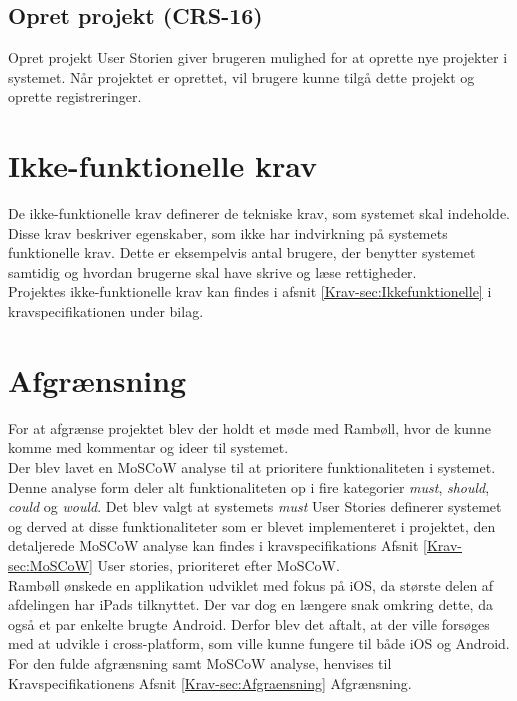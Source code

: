 	\subsection*{Opret projekt (CRS-16)}
	Opret projekt User Storien giver brugeren mulighed for at oprette nye projekter i systemet. Når projektet er oprettet, vil brugere kunne tilgå dette projekt og oprette registreringer. \\
	

\section{Ikke-funktionelle krav}
De ikke-funktionelle krav definerer de tekniske krav, som systemet skal indeholde. Disse krav beskriver egenskaber, som ikke har indvirkning på systemets funktionelle krav. Dette er eksempelvis antal brugere, der benytter systemet samtidig og hvordan brugerne skal have skrive og læse rettigheder. \\
Projektes ikke-funktionelle krav kan findes i afsnit \ref{Krav-sec:Ikkefunktionelle} i kravspecifikationen under bilag. \\

\section{Afgrænsning}
For at afgrænse projektet blev der holdt et møde med Rambøll, hvor de kunne komme med kommentar og ideer til systemet. \\
Der blev lavet en MoSCoW analyse til at prioritere funktionaliteten i systemet. Denne analyse form deler alt funktionaliteten op i fire kategorier \emph{must}, \emph{should}, \emph{could} og \emph{would}.
Det blev valgt at systemets \emph{must} User Stories definerer systemet og derved at disse funktionaliteter som er blevet implementeret i projektet, den detaljerede MoSCoW analyse kan findes i kravspecifikations Afsnit \ref{Krav-sec:MoSCoW} User stories, prioriteret efter MoSCoW. \\
Rambøll ønskede en applikation udviklet med fokus på iOS, da største delen af afdelingen har iPads tilknyttet. Der var dog en længere snak omkring dette, da også et par enkelte brugte Android. Derfor blev det aftalt, at der ville forsøges med at udvikle i cross-platform, som ville kunne fungere til både iOS og Android.
For den fulde afgrænsning samt MoSCoW analyse, henvises til Kravspecifikationens Afsnit \ref{Krav-sec:Afgraensning} Afgrænsning.
	